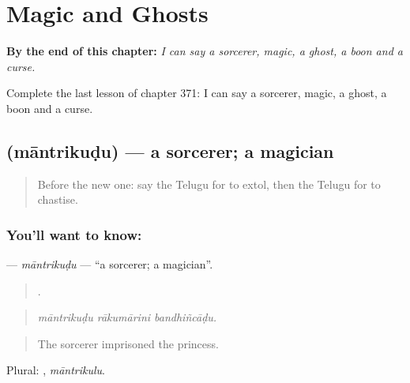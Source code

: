
\chapter{Magic and Ghosts}
\label{ch:te-magic-and-ghosts}

\begin{chapteropening}
\textbf{By the end of this chapter:} \emph{I can say a sorcerer, magic, a ghost, a boon and a curse.}

Complete the last lesson of chapter 371: I can say a sorcerer, magic, a ghost, a boon and a curse.
\end{chapteropening}

\section[\texorpdfstring{\te{మాంత్రికుడు} (māntrikuḍu)}{మాంత్రికుడు (māntrikuḍu)}]{ (māntrikuḍu) — a sorcerer; a magician}

\label{lesson:TE-C371-mantrikudu}



\begin{quote}
Before the new one: say the Telugu for to extol, then the Telugu for to chastise.
\end{quote}

\subsection*{You'll want to know: }
\textbf{} — \emph{māntrikuḍu} — \textquotedblleft{}a sorcerer; a magician\textquotedblright{}.

\begin{quote}
  .
\end{quote}

\begin{quote}
\emph{māntrikuḍu rākumārini bandhiñcāḍu.}
\end{quote}

\begin{quote}
The sorcerer imprisoned the princess.
\end{quote}

Plural: , \emph{māntrikulu}.

